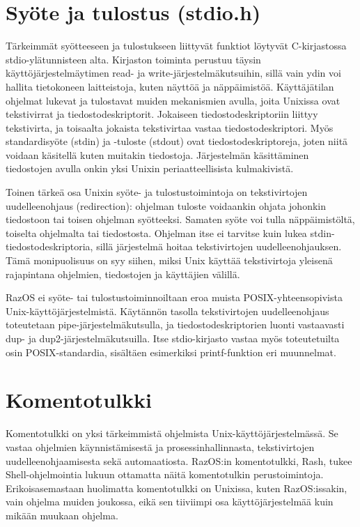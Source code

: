 \section{Syöte ja tulostus (stdio.h)}

Tärkeimmät syötteeseen ja tulostukseen liittyvät funktiot löytyvät C-kirjastossa stdio-ylätunnisteen alta. Kirjaston toiminta perustuu täysin käyttöjärjestelmäytimen read- ja write-järjestelmäkutsuihin, sillä vain ydin voi hallita tietokoneen laitteistoja, kuten näyttöä ja näppäimistöä. Käyttäjätilan ohjelmat lukevat ja tulostavat muiden mekanismien avulla, joita Unixissa ovat tekstivirrat ja tiedostodeskriptorit. Jokaiseen tiedostodeskriptoriin liittyy tekstivirta, ja toisaalta jokaista tekstivirtaa vastaa tiedostodeskriptori. Myös standardisyöte (stdin) ja -tuloste (stdout) ovat tiedostodeskriptoreja, joten niitä voidaan käsitellä kuten muitakin tiedostoja. Järjestelmän käsittäminen tiedostojen avulla onkin yksi Unixin periaatteellisista kulmakivistä.

\par

Toinen tärkeä osa Unixin syöte- ja tulostustoimintoja on tekstivirtojen uudelleenohjaus (redirection): ohjelman tuloste voidaankin ohjata johonkin tiedostoon tai toisen ohjelman syötteeksi. Samaten syöte voi tulla näppäimistöltä, toiselta ohjelmalta tai tiedostosta. Ohjelman itse ei tarvitse kuin lukea stdin-tiedostodeskriptoria, sillä järjestelmä hoitaa tekstivirtojen uudelleenohjauksen. Tämä monipuolisuus on syy siihen, miksi Unix käyttää tekstivirtoja yleisenä rajapintana ohjelmien, tiedostojen ja käyttäjien välillä.

\par

RazOS ei syöte- tai tulostustoiminnoiltaan eroa muista POSIX-yhteensopivista Unix-käyttöjärjestelmistä. Käytännön tasolla tekstivirtojen uudelleenohjaus toteutetaan pipe-järjestelmäkutsulla, ja tiedostodeskriptorien luonti vastaavasti dup- ja dup2-järjestelmäkutsuilla. Itse stdio-kirjasto vastaa myös toteutetuilta osin POSIX-standardia, sisältäen esimerkiksi printf-funktion eri muunnelmat.

\section{Komentotulkki}

Komentotulkki on yksi tärkeimmistä ohjelmista Unix-käyttöjärjestelmässä. Se vastaa ohjelmien käynnistämisestä ja prosessinhallinnasta, tekstivirtojen uudelleenohjaamisesta sekä automaatiosta. RazOS:in komentotulkki, Rash, tukee Shell-ohjelmointia lukuun ottamatta näitä komentotulkin perustoimintoja. Erikoisasemastaan huolimatta komentotulkki on Unixissa, kuten RazOS:issakin, vain ohjelma muiden joukossa, eikä sen tiiviimpi osa käyttöjärjestelmää kuin mikään muukaan ohjelma.

